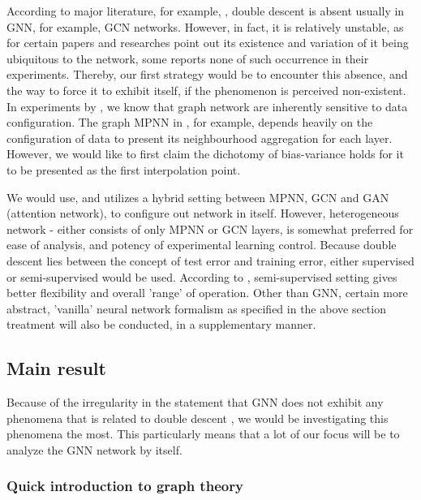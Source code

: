 According to major literature, for example, \cite{shi2024homophilymodulatesdoubledescent}, double descent is absent usually in GNN, for example, GCN networks. However, in fact, it is relatively unstable, as for certain papers and researches point out its existence and variation of it being ubiquitous to the network, some reports none of such occurrence in their experiments. Thereby, our first strategy would be to encounter this absence, and the way to force it to exhibit itself, if the phenomenon is perceived non-existent. In experiments by \cite{shi2024homophilymodulatesdoubledescent,buschjager_generalized_2020}, we know that graph network are inherently sensitive to data configuration. The graph MPNN in \cite{GRP_Hamilton}, for example, depends heavily on the configuration of data to present its neighbourhood aggregation for each layer. However, we would like to first claim the dichotomy of bias-variance holds for it to be presented as the first interpolation point.

We would use, and utilizes a hybrid setting between MPNN, GCN and GAN (attention network), to configure out network in itself. However, heterogeneous network - either consists of only MPNN or GCN layers, is somewhat preferred for ease of analysis, and potency of experimental learning control. Because double descent lies between the concept of test error and training error, either supervised or semi-supervised would be used. According to \cite{shi2024homophilymodulatesdoubledescent}, semi-supervised setting gives better flexibility and overall 'range' of operation. Other than GNN, certain more abstract, 'vanilla' neural network formalism as specified in the above section treatment will also be conducted, in a supplementary manner. 

\subsection{Main result}

Because of the irregularity in the statement that GNN does not exhibit any phenomena that is related to double descent \cite{shi2024homophilymodulatesdoubledescent}, we would be investigating this phenomena the most. This particularly means that a lot of our focus will be to analyze the GNN network by itself. 

\subsubsection{Quick introduction to graph theory}

